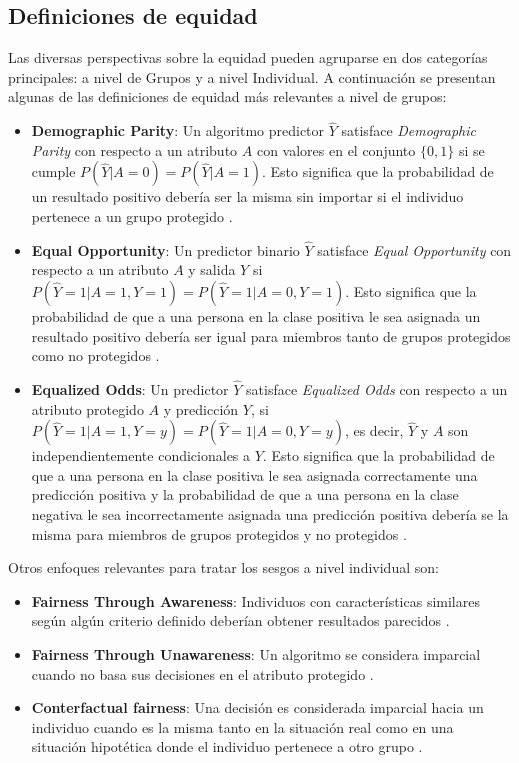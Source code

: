 \subsection{Definiciones de equidad}
Las diversas perspectivas sobre la equidad pueden agruparse en dos categor\'ias principales: a nivel de Grupos y a nivel Individual. 
A continuaci\'on se presentan algunas de las definiciones de equidad m\'as relevantes a nivel de grupos:

\begin{itemize}
    \item \textbf{Demographic Parity}: Un algoritmo predictor $\hat{Y}$ satisface \textit{Demographic Parity}
    con respecto a un atributo $A$ con valores en el conjunto $\{0,1\}$ si se cumple $P(\hat{Y} | A = 0) = P(\hat{Y} | A = 1)$. 
    Esto significa que la probabilidad de un resultado positivo debería ser la misma sin importar si el individuo pertenece a
    un grupo protegido \cite{fairness_def}.

    \item \textbf{Equal Opportunity}: Un predictor binario $\hat{Y}$ satisface \textit{Equal Opportunity} con 
    respecto a un atributo $A$ y salida $Y$ si $P(\hat{Y} = 1 | A = 1, Y = 1) = P(\hat{Y} = 1 | A = 0, Y = 1)$. Esto significa
    que la probabilidad de que a una persona en la clase positiva le sea asignada un resultado positivo 
    deber\'ia ser igual para miembros tanto de grupos protegidos como no protegidos \cite{fairness_def}.

    \item \textbf{Equalized Odds}: Un predictor $\hat{Y}$ satisface \textit{Equalized Odds} con respecto a un atributo
    protegido $A$ y predicci\'on $Y$, si $P(\hat{Y} = 1 | A = 1, Y = y) = P(\hat{Y} = 1 | A = 0, Y = y)$, es decir,
    $\hat{Y}$ y $A$ son independientemente condicionales a $Y$. Esto significa que la probabilidad de que a una persona 
    en la clase positiva le sea asignada correctamente una predicci\'on positiva y la probabilidad de que a una persona en la 
    clase negativa le sea incorrectamente asignada una predicci\'on positiva deber\'ia se la misma para miembros de grupos 
    protegidos y no protegidos \cite{fairness_def}.
\end{itemize}

Otros enfoques relevantes para tratar los sesgos a nivel individual son:

\begin{itemize}
    \item \textbf{Fairness Through Awareness}: Individuos con caracter\'isticas similares seg\'un alg\'un criterio 
    definido deber\'ian obtener resultados parecidos \cite{fair_awareness}.
    \item \textbf{Fairness Through Unawareness}: Un algoritmo se considera imparcial cuando no basa sus decisiones en el 
    atributo protegido \cite{counterfactual}.
    \item \textbf{Conterfactual fairness}: Una decisi\'on es considerada imparcial hacia un individuo cuando es la misma
    tanto en la situaci\'on real como en una situaci\'on hipot\'etica donde el individuo pertenece a otro grupo \cite{counterfactual}.
\end{itemize}


